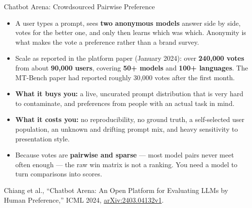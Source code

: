\begin{frame}{Chatbot Arena: Crowdsourced Pairwise Preference}
  \begin{itemize}\itemsep0.05em
    \item[\textcolor{red}{$\blacktriangleright$}] A user types a prompt, sees \textbf{two anonymous models} answer side by side, votes for the better one, and only then learns which was which. Anonymity is what makes the vote a preference rather than a brand survey.
    \item[\textcolor{red}{$\blacktriangleright$}] Scale as reported in the platform paper (January 2024): over \textbf{240{,}000 votes} from about \textbf{90{,}000 users}, covering \textbf{50+ models} and \textbf{100+ languages}. The MT-Bench paper had reported roughly 30{,}000 votes after the first month.
    \item[\textcolor{red}{$\blacktriangleright$}] \textbf{What it buys you:} a live, uncurated prompt distribution that is very hard to contaminate, and preferences from people with an actual task in mind.
    \item[\textcolor{red}{$\blacktriangleright$}] \textbf{What it costs you:} no reproducibility, no ground truth, a self-selected user population, an unknown and drifting prompt mix, and heavy sensitivity to presentation style.
    \item[\textcolor{red}{$\blacktriangleright$}] Because votes are \textbf{pairwise and sparse} --- most model pairs never meet often enough --- the raw win matrix is not a ranking. You need a model to turn comparisons into scores.
  \end{itemize}
  {\scriptsize Chiang et al., ``Chatbot Arena: An Open Platform for Evaluating LLMs by Human Preference,'' ICML 2024, \href{https://arxiv.org/abs/2403.04132v1}{arXiv:2403.04132v1}.}
\end{frame}

